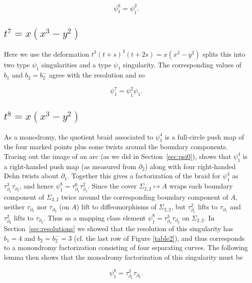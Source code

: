 \documentclass[11pt,letterpaper,reqno]{amsart}
\theoremstyle{remark}
\begin{document}
\[\psi_1^6 = \psi_{\tilde{1}}^2.\]


\subsection{\texorpdfstring{{\boldmath $t^7= x(x^3-y^2)$}}{psi7}}
\label{sec:psi7}
Here we use the deformation $t^3(t+s)^3(t+2s) = x(x^3-y^2)$ splits this into two type $\psi_{\tilde{1}}$ singularities and a type $\psi_1$ singularity. The corresponding values of $b_1$ and $b_2 = b_2^-$ agree with the resolution and so 

\[\psi_1^7 = \psi_{\tilde{1}}^2\psi_{{1}}.\]


\subsection{\texorpdfstring{{\boldmath $t^8= x(x^3-y^2)$}}{psi8}}
\label{sec:psi8}

As a monodromy, the quotient braid associated to $\psi_1^4$ is a full-circle push map of the four marked points plus some twists around the boundary components. Tracing out the image of an arc (as we did in Section~\ref{sec:psi0}), shows that $\psi_1^4$ is a right-handed push map (as measured from $\partial_2$) along with four right-handed Dehn twists about $\partial_1$. Together this gives a factorization of the braid for $\psi_1^4$ as $\tau_{\partial_1}^3 \tau_{\partial_2}$, and hence $\psi_1^8 = \tau_{\partial_1}^6 \tau_{\partial_2}^2$. Since the cover $\Sigma_{2,2} \mapsto A$ wraps each boundary component of $\Sigma_{2,2}$ twice around the corresponding boundary component of $A$, neither $\tau_{\partial_1}$ nor $\tau_{\partial_2}$ (on $A$) lift to diffeomorphisms of $\Sigma_{2,2}$, but $\tau_{\partial_1}^2$ lifts to $\tau_{\partial_1}$ and $\tau_{\partial_2}^2$ lifts to $\tau_{\partial_2}$. Thus as a mapping class element $\psi_1^8 = \tau_{\partial_1}^3\tau_{\partial_2}$ on $\Sigma_{2,2}$. In Section~\ref{sec:resolutions} we showed that the resolution of this singularity has $b_1 = 4$ and $b_2 = b_2^{-} = 3$ (cf. the last row of Figure \ref{table2}), and thus corresponds to a monondromy factorization consisting of four separating curves. The following lemma then shows that the monodromy factorization of this singularity must be

\[\psi_1^8 = \tau_{\partial_1}^3\tau_{\partial_2}.\]
\end{document}
